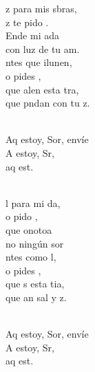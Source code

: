 \begin{cancion}[Envíame][Ixcís]%
	z para mis sbras,\\
	z te pido . \\
	Ende mi ada\\
	con  luz de tu am.\\
	ntes que ilunen, \\
	o pides , \\
	que alen esta tra,\\
	que pndan con tu z.\\\jump\\
	\begin{chorus}%
	Aq estoy, Sor, envíe  \\
	A estoy, Sr, \\
	aq est.  \\
	\end{chorus}%
	\jump\\
	l para mi da,\\
	o pido , \\
	que onotoa \\
	no  ningún sor\\
	ntes como l,\\
	o pides , \\
	que s esta tia,\\
	que an sal y z.\\\jump\\
	\begin{chorus}%
	Aq estoy, Sor, envíe  \\
	A estoy, Sr, \\
	aq est.  \\

\end{chorus}
\end{cancion}
